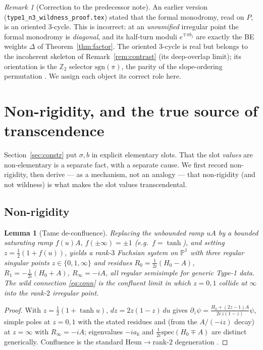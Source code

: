 \documentclass[11pt]{article}
\newtheorem{lemma}{Lemma}
\theoremstyle{definition}
\theoremstyle{remark}
\newtheorem{remark}{Remark}
\newcommand{\PP}{\mathbb{P}^1}
\begin{document}
\begin{remark}[Correction to the predecessor note]\label{rem:retract}
An earlier version (\texttt{type1\_n3\_wildness\_proof.tex}) stated that the formal monodromy,
read on $P$, is an oriented $3$-cycle. This is incorrect: at an \emph{unramified} irregular
point the formal monodromy is \emph{diagonal}, and its half-turn moduli $e^{\mp\pi b_j}$ are
exactly the BE weights $\Delta$ of Theorem~\ref{thm:factor}. The oriented $3$-cycle is real
but belongs to the incoherent skeleton of Remark~\ref{rem:contrast} (its deep-overlap limit);
its orientation is the $\mathbb{Z}_2$ selector $\mathrm{sgn}(\pi)$, the parity of the
slope-ordering permutation \cite{OWY2009}. We assign each object its correct role here.
\end{remark}

\section{Non-rigidity, and the true source of transcendence}\label{sec:deriv}

Section~\ref{sec:constr} put $\sigma,b$ in explicit elementary slots. That the slot
\emph{values} are non-elementary is a separate fact, with a separate cause. We first record
non-rigidity, then derive --- as a mechanism, not an analogy --- that non-rigidity (and not
wildness) is what makes the slot values transcendental.

\subsection{Non-rigidity}

\begin{lemma}[Tame de-confluence]\label{lem:deconf}
Replacing the unbounded ramp $uA$ by a bounded saturating ramp $f(u)A$, $f(\pm\infty)=\pm1$
(e.g.\ $f=\tanh$), and setting $z=\tfrac12(1+f(u))$, yields a rank-$3$ Fuchsian system on
$\PP$ with three regular singular points $z\in\{0,1,\infty\}$ and residues
$R_0=\tfrac{1}{2i}(H_0-A)$, $R_1=-\tfrac{1}{2i}(H_0+A)$, $R_\infty=-iA$, all regular
semisimple for generic Type-1 data. The wild connection \eqref{eq:conn} is the confluent
limit in which $z=0,1$ collide at $\infty$ into the rank-$2$ irregular point.
\end{lemma}

\begin{proof}
With $z=\tfrac12(1+\tanh u)$, $dz=2z(1-z)\,du$ gives
$\partial_z\psi=\frac{H_0+(2z-1)A}{2i\,z(1-z)}\psi$, simple poles at $z=0,1$ with the stated
residues and (from the $A/(-iz)$ decay) at $z=\infty$ with $R_\infty=-iA$; eigenvalues
$-ia_k$ and $\tfrac1{2i}\mathrm{spec}(H_0\mp A)$ are distinct generically. Confluence is the
standard Heun$\to$rank-$2$ degeneration \cite{Ronveaux1995,JMU1981}.
\end{proof}
\end{document}
